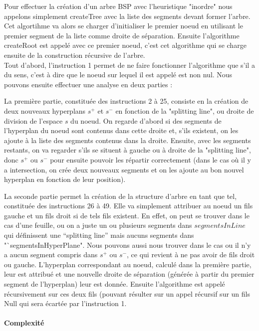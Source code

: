 \documentclass[11pt,a4paper]{article}
\begin{document}
Pour effectuer la création d'un arbre BSP avec l'heuristique "inordre" nous appelons simplement createTree avec la liste des segments devant former l'arbre. Cet algortihme va alors se charger d'initialiser le premier noeud en utilisant le premier segment de la liste comme droite de séparation. Ensuite l'algorithme createRoot est appelé avec ce premier noeud, c'est cet algorithme qui se charge ensuite de la construction récursive de l'arbre. \\

Tout d'abord, l'instruction 1 permet de ne faire fonctionner l'algorithme que s'il a du sens, c'est à dire que le noeud sur lequel il est appelé est non nul. Nous pouvons ensuite effectuer une analyse en deux parties : 

La première partie, constituée des instructions 2 à 25, consiste en la création de deux nouveaux hyperplans $s^+$ et $s^-$ en fonction de la "splitting line", ou droite de division de l'espace $s$ du noeud. On regarde d'abord si des segments de l'hyperplan du noeud sont contenus dans cette droite et, s'ils existent, on les ajoute à la liste des segments contenus dans la droite. Ensuite, avec les segments restants, on va regarder s'ils se situent à gauche ou à droite de la "splitting line", donc $s^+$ ou $s^-$ pour ensuite pouvoir les répartir correctement (dans le cas où il y a intersection, on crée deux nouveaux segments et on les ajoute au bon nouvel hyperplan en fonction de leur position). 

La seconde partie permet la création de la structure d'arbre en tant que tel, constituée des instructions 26 à 49. Elle va simplement attribuer au noeud un fils gauche et un fils droit si de tels fils existent. En effet, on peut se trouver dans le cas d'une feuille, ou on a juste un ou plusieurs segments dans $segmentsInLine$ qui définissent une "`splitting line"' mais aucuns segments dans "`segmentsInHyperPlane". Nous pouvons aussi nous trouver dans le cas ou il n'y a aucun segment compris dans $s^+$ ou $s^-$, ce qui revient à ne pas avoir de fils droit ou gauche. L'hyperplan correspondant au noeud, calculé dans la première partie, leur est attribué et une nouvelle droite de séparation (générée à partir du premier segment de l'hyperplan) leur est donnée. Ensuite l'algorithme est appelé récursivement sur ces deux fils (pouvant résulter sur un appel récursif sur un fils Null qui sera écartée par l'instruction 1. 

\paragraph{Complexité}
\end{document}
